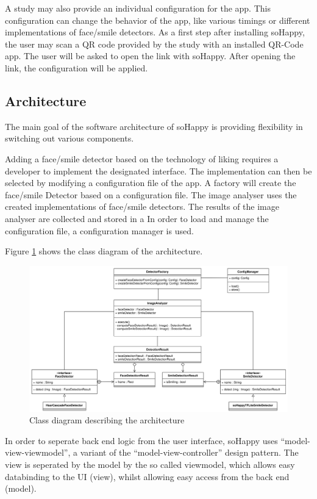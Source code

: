 A study may also provide an individual configuration for the app. This configuration
can change the behavior of the app, like various timings or different implementations
of face/smile detectors.
As a first step after installing soHappy, the user may scan a QR code provided
by the study with an installed QR-Code app. The user will be asked to open the
link with soHappy. After opening the link, the configuration will be applied.

\subsection{Architecture}

The main goal of the software architecture of soHappy is providing flexibility 
in switching out various components.

Adding a face/smile detector based on the technology of liking requires a
developer to implement the designated interface. The implementation can then be 
selected by modifying a configuration file of the app. A factory will create 
the face/smile Detector based on a configuration file. 
The image analyser uses the created implementations of face/smile
detectors. The results of the image analyser are collected and stored in a
In order to load and manage the configuration file, a configuration manager 
is used.

Figure \ref{fig:arch1} shows the class diagram of the architecture.

\begin{figure}
    \includegraphics[width=\linewidth]{figures/methodology_architecture_1.png}
    \caption{Class diagram describing the architecture}
    \label{fig:arch1}
\end{figure}

In order to seperate back end logic from the user interface, soHappy uses
``model-view-viewmodel'', a variant of the ``model-view-controller'' design 
pattern. The view is seperated by the model by the so called viewmodel, which
allows easy databinding to the UI (view), whilst allowing easy access from the
back end (model). \cite{mvvm}

